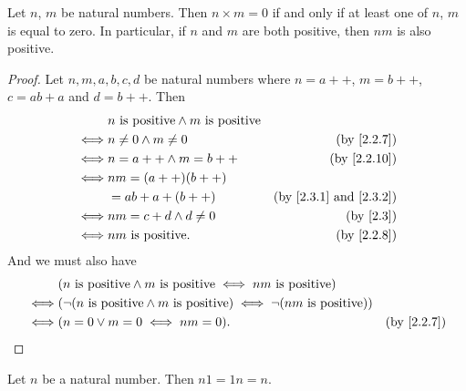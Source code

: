 \begin{lemma}\label{2.3.3}
  Let \(n\), \(m\) be natural numbers.
  Then \(n \times m = 0\) if and only if at least one of \(n\), \(m\) is equal to zero.
  In particular, if \(n\) and \(m\) are both positive, then \(nm\) is also positive.
\end{lemma}

\begin{proof}
  Let \(n, m, a, b, c, d\) be natural numbers where \(n = a++\), \(m = b++\), \(c = ab + a\) and \(d = b++\).
  Then
  \begin{align*}
         & n \text{ is positive} \land m \text{ is positive}                                             \\
    \iff & n \neq 0 \land m \neq 0                           & \text{(by \cref{2.2.7})}                  \\
    \iff & n = a++ \land m = b++                             & \text{(by \cref{2.2.10})}                 \\
    \iff & nm = (a++)(b++)                                                                               \\
         & = ab + a + (b++)                                  & \text{(by \cref{2.3.1} and \cref{2.3.2})} \\
    \iff & nm = c + d \land d \neq 0                         & \text{(by \cref{2.3})}                    \\
    \iff & nm \text{ is positive}.                           & \text{(by \cref{2.2.8})}
  \end{align*}
  And we must also have
  \begin{align*}
         & (n \text{ is positive} \land m \text{ is positive} \iff nm \text{ is positive})                                            \\
    \iff & (\lnot (n \text{ is positive} \land m \text{ is positive}) \iff \lnot (nm \text{ is positive}))                            \\
    \iff & (n = 0 \lor m = 0 \iff nm = 0).                                                                 & \text{(by \cref{2.2.7})}
  \end{align*}
\end{proof}

\begin{additional corollary}\label{ac 2.3.4}
Let \(n\) be a natural number.
Then \(n1 = 1n = n\).
\end{additional corollary}

